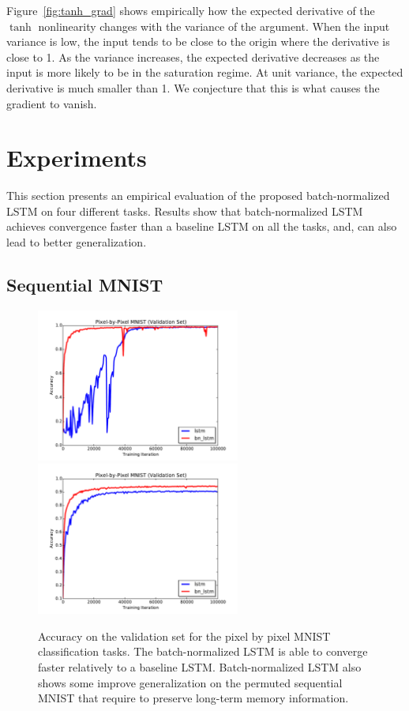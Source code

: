 \documentclass{article} %
\begin{document}
Figure~\ref{fig:tanh_grad} shows empirically how the expected derivative of the $\tanh$ nonlinearity changes with the variance of the argument.
When the input variance is low, the input tends to be close to the origin where the derivative is close to 1.
As the variance increases, the expected derivative decreases as the input is more likely to be in the saturation regime.
At unit variance, the expected derivative is much smaller than 1.
We conjecture that this is what causes the gradient to vanish.


\section{Experiments}
\label{sec:experiments}

This section presents an empirical evaluation of the proposed batch-normalized LSTM on four different tasks. Results show that batch-normalized LSTM achieves convergence faster than a baseline LSTM on all the tasks, and, can also lead to better generalization.



\subsection{Sequential MNIST}
\label{sec:seqmnist}

\begin{figure}
\center
\includegraphics[width=6.7cm]{figures/unpermuted_valid.pdf}
\includegraphics[width=6.7cm]{figures/permuted_valid.pdf}
\caption{Accuracy on the validation set for the pixel by pixel MNIST classification tasks. The batch-normalized LSTM is able to converge faster relatively to a baseline LSTM.
  Batch-normalized  LSTM also shows some improve generalization on the permuted sequential MNIST that require to preserve long-term memory information.}
\label{fig:seqmnist_valid}
\end{figure}
\end{document}
